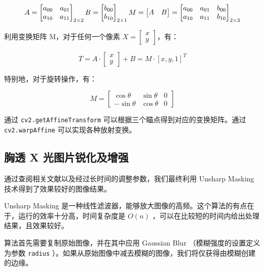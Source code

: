 \documentclass[11pt]{ctexart}
\begin{document}
$$
A = \begin{bmatrix} a_{00} & a_{01} \\ a_{10} & a_{11} \end{bmatrix}_{2 \times 2}
B = \begin{bmatrix} b_{00} \\ b_{10} \end{bmatrix}_{2 \times 1} \\ \newline
M = \begin{bmatrix} A & B \end{bmatrix} = \begin{bmatrix} a_{00} & a_{01} & b_{00} \\ a_{10} & a_{11} & b_{10} \end{bmatrix}_{2 \times 3}
$$

利用变换矩阵 M，对于任何一个像素 $X = \begin{bmatrix}x \\ y\end{bmatrix}$，有：

$$
T = A \cdot \begin{bmatrix}x \\ y\end{bmatrix} + B = M \cdot [x, y, 1]^{T}
$$

特别地，对于旋转操作，有：

$$
M = \begin{bmatrix}
\cos \theta & \sin \theta & 0 \\
-\sin \theta & \cos \theta & 0
\end{bmatrix}
$$

通过 \texttt{cv2.getAffineTransform} 可以根据三个瞄点得到对应的变换矩阵。通过 \texttt{cv2.warpAffine} 可以实现各种放射变换。

\subsection{胸透 X 光图片锐化及增强}

通过查阅相关文献以及经过长时间的调整参数，我们最终利用 Unsharp Masking 技术得到了效果较好的图像结果。

Unsharp Masking 是一种线性滤波器，能够放大图像的高频。这个算法的有点在于，运行的效率十分高，时间复杂度是 $O(n)$ ，可以在比较短的时间内给出处理结果，且效果较好。

算法首先需要复制原始图像，并在其中应用 Gaussian Blur （模糊强度的设置定义为参数 \texttt{radius} ）。如果从原始图像中减去模糊的图像，我们将仅获得由模糊创建的边缘。
\end{document}
